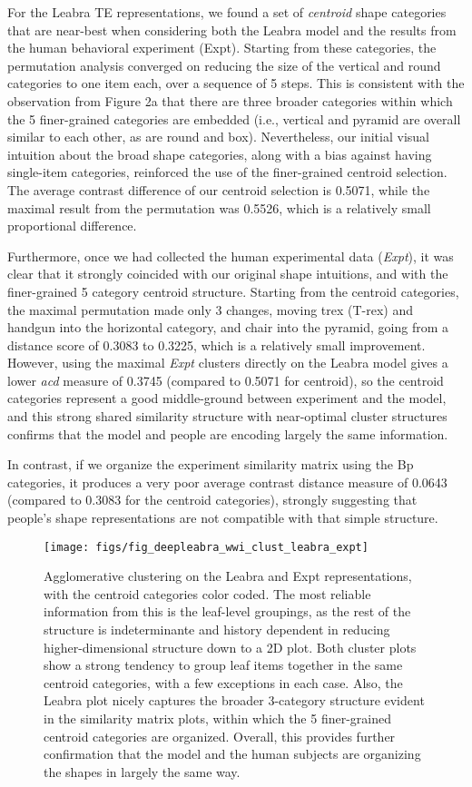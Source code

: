 \documentclass[12pt,twoside]{article}
\newif\myifpdf
\begin{document}
For the Leabra TE representations, we found a set of {\em centroid} shape categories that are near-best when considering both the Leabra model and the results from the human behavioral experiment (Expt).  Starting from these  categories, the permutation analysis converged on reducing the size of the vertical and round categories to one item each, over a sequence of 5 steps.  This is consistent with the observation from Figure 2a that there are three broader categories within which the 5 finer-grained categories are embedded (i.e., vertical and pyramid are overall similar to each other, as are round and box).  Nevertheless, our initial visual intuition about the broad shape categories, along with a bias against having single-item categories, reinforced the use of the finer-grained centroid selection.  The average contrast difference of our centroid selection is 0.5071, while the maximal result from the permutation was 0.5526, which is a relatively small proportional difference.

Furthermore, once we had collected the human experimental data ({\em Expt}), it was clear that it strongly coincided with our original shape intuitions, and with the finer-grained 5 category centroid structure.  Starting from the centroid categories, the maximal permutation made only 3 changes, moving trex (T-rex) and handgun into the horizontal category, and chair into the pyramid, going from a distance score of 0.3083 to 0.3225, which is a relatively small improvement.  However, using the maximal {\em Expt} clusters directly on the Leabra model gives a lower {\em acd} measure of 0.3745 (compared to 0.5071 for centroid), so the centroid categories represent a good middle-ground between experiment and the model, and this strong shared similarity structure with near-optimal cluster structures confirms that the model and people are encoding largely the same information.

In contrast, if we organize the experiment similarity matrix using the Bp categories, it produces a very poor average contrast distance measure of 0.0643 (compared to 0.3083 for the centroid categories), strongly suggesting that people's shape representations are not compatible with that simple structure.

\begin{figure}
  \centering\texttt{[image: figs/fig\_deepleabra\_wwi\_clust\_leabra\_expt]}
  \caption{ Agglomerative clustering on the Leabra and Expt representations, with the centroid categories color coded.  The most reliable information from this is the leaf-level groupings, as the rest of the structure is indeterminante and history dependent in reducing higher-dimensional structure down to a 2D plot.  Both cluster plots show a strong tendency to group leaf items together in the same centroid categories, with a few exceptions in each case.  Also, the Leabra plot nicely captures the broader 3-category structure evident in the similarity matrix plots, within which the 5 finer-grained centroid categories are organized.  Overall, this provides further confirmation that the model and the human subjects are organizing the shapes in largely the same way.}
  \label{fig.clust}
\end{figure}
\end{document}
